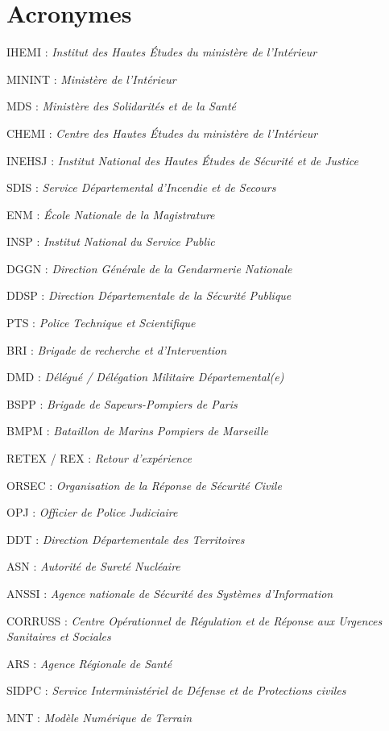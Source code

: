 \documentclass[10pt,a4paper]{report} %
\newcommand{\mychapter}[2]{ %
    \setcounter{chapter}{#1}
    \setcounter{section}{0}
    \chapter*{#2}
    \addcontentsline{toc}{chapter}{#2}
}
\begin{document}
\mychapter{9}{Acronymes}       

IHEMI : \textit{Institut des Hautes Études du ministère de l’Intérieur}


MININT : \textit{Ministère de l’Intérieur}


MDS : \textit{Ministère des Solidarités et de la Santé}


CHEMI : \textit{Centre des Hautes Études du ministère de l’Intérieur}


INEHSJ : \textit{Institut National des Hautes Études de Sécurité et de Justice}


SDIS : \textit{Service Départemental d’Incendie et de Secours}


ENM : \textit{École Nationale de la Magistrature}


INSP : \textit{Institut National du Service Public}


DGGN : \textit{Direction Générale de la Gendarmerie Nationale}


DDSP : \textit{Direction Départementale de la Sécurité Publique}


PTS : \textit{Police Technique et Scientifique}


BRI : \textit{Brigade de recherche et d'Intervention}


DMD : \textit{Délégué / Délégation Militaire Départemental(e)}


BSPP : \textit{Brigade de Sapeurs-Pompiers de Paris}


BMPM : \textit{Bataillon de Marins Pompiers de Marseille}


RETEX / REX : \textit{Retour d’expérience}


ORSEC : \textit{Organisation de la Réponse de Sécurité Civile}


OPJ : \textit{Officier de Police Judiciaire}


DDT : \textit{Direction Départementale des Territoires}


ASN : \textit{Autorité de Sureté Nucléaire}


ANSSI : \textit{Agence nationale de Sécurité des Systèmes d’Information}


CORRUSS : \textit{Centre Opérationnel de Régulation et de Réponse aux Urgences Sanitaires et Sociales}


ARS : \textit{Agence Régionale de Santé}


SIDPC : \textit{Service Interministériel de Défense et de Protections civiles}


MNT : \textit{Modèle Numérique de Terrain}
\end{document}
